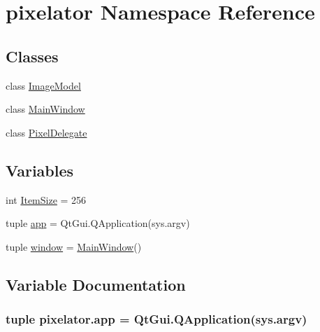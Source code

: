 \hypertarget{namespacepixelator}{}\section{pixelator Namespace Reference}
\label{namespacepixelator}
\subsection*{Classes}
\begin{DoxyCompactItemize}
\item 
class \hyperlink{classpixelator_1_1ImageModel}{Image\+Model}
\item 
class \hyperlink{classpixelator_1_1MainWindow}{Main\+Window}
\item 
class \hyperlink{classpixelator_1_1PixelDelegate}{Pixel\+Delegate}
\end{DoxyCompactItemize}
\subsection*{Variables}
\begin{DoxyCompactItemize}
\item 
int \hyperlink{namespacepixelator_af92308fa1155e29d3f59eef12e78969a}{Item\+Size} = 256
\item 
tuple \hyperlink{namespacepixelator_ac5df54e809feaaa1e112762c3be7db48}{app} = Qt\+Gui.\+Q\+Application(sys.\+argv)
\item 
tuple \hyperlink{namespacepixelator_adb7ae0f85088daea1fd6776505cd28ac}{window} = \hyperlink{classpixelator_1_1MainWindow}{Main\+Window}()
\end{DoxyCompactItemize}


\subsection{Variable Documentation}
\hypertarget{namespacepixelator_ac5df54e809feaaa1e112762c3be7db48}{}
\subsubsection[{app}]{\setlength{\rightskip}{0pt plus 5cm}tuple pixelator.\+app = Qt\+Gui.\+Q\+Application(sys.\+argv)}\label{namespacepixelator_ac5df54e809feaaa1e112762c3be7db48}
\hypertarget{namespacepixelator_af92308fa1155e29d3f59eef12e78969a}{}
